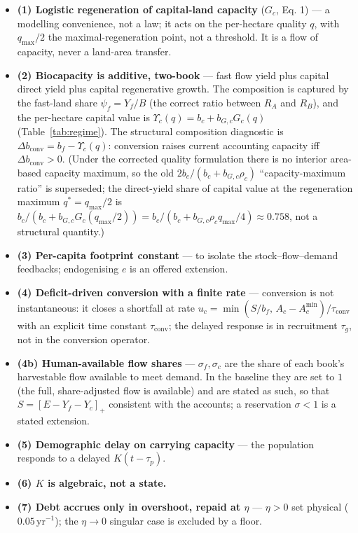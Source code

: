 \documentclass[11pt]{article}
\begin{document}
\begin{itemize}
\item \textbf{(1) Logistic regeneration of capital-land capacity} ($G_c$, Eq. 1) --- a modelling convenience, not a law; it acts on the per-hectare quality $q$, with $q_{\max}/2$ the maximal-regeneration point, not a threshold. It is a flow of capacity, never a land-area transfer.
\item \textbf{(2) Biocapacity is additive, two-book} --- fast flow yield plus capital direct yield plus capital regenerative growth. The composition is captured by the fast-land share $\psi_f=Y_f/B$ (the correct ratio between $R_A$ and $R_B$), and the per-hectare capital value is $\Upsilon_c(q)=b_c+b_{G,c}G_c(q)$ (Table~\ref{tab:regime}). The structural composition diagnostic is $\Delta b_{\mathrm{conv}}=b_f-\Upsilon_c(q)$: conversion raises current accounting capacity iff $\Delta b_{\mathrm{conv}}>0$. (Under the corrected quality formulation there is no interior area-based capacity maximum, so the old $2b_c/(b_c+b_{G,c}\rho_c)$ ``capacity-maximum ratio'' is superseded; the direct-yield share of capital value at the regeneration maximum $q^*=q_{\max}/2$ is $b_c/(b_c+b_{G,c}G_c(q_{\max}/2))=b_c/(b_c+b_{G,c}\rho_c q_{\max}/4)\approx0.758$, not a structural quantity.)
\item \textbf{(3) Per-capita footprint constant} --- to isolate the stock--flow--demand feedbacks; endogenising $e$ is an offered extension.
\item \textbf{(4) Deficit-driven conversion with a finite rate} --- conversion is not instantaneous: it closes a shortfall at rate $u_c=\min(S/b_f,\,A_c-A_c^{\min})/\tau_{\mathrm{conv}}$ with an explicit time constant $\tau_{\mathrm{conv}}$; the delayed response is in recruitment $\tau_g$, not in the conversion operator.
\item \textbf{(4b) Human-available flow shares} --- $\sigma_f,\sigma_c$ are the share of each book's harvestable flow available to meet demand. In the baseline they are set to $1$ (the full, share-adjusted flow is available) and are stated as such, so that $S=[E-Y_f-Y_c]_+$ consistent with the accounts; a reservation $\sigma<1$ is a stated extension.
\item \textbf{(5) Demographic delay on carrying capacity} --- the population responds to a delayed $K(t-\tau_p)$.
\item \textbf{(6) $K$ is algebraic, not a state.}
\item \textbf{(7) Debt accrues only in overshoot, repaid at $\eta$} --- $\eta>0$ set physical ($0.05\,\text{yr}^{-1}$); the $\eta\to0$ singular case is excluded by a floor.

\end{itemize}
\end{document}
